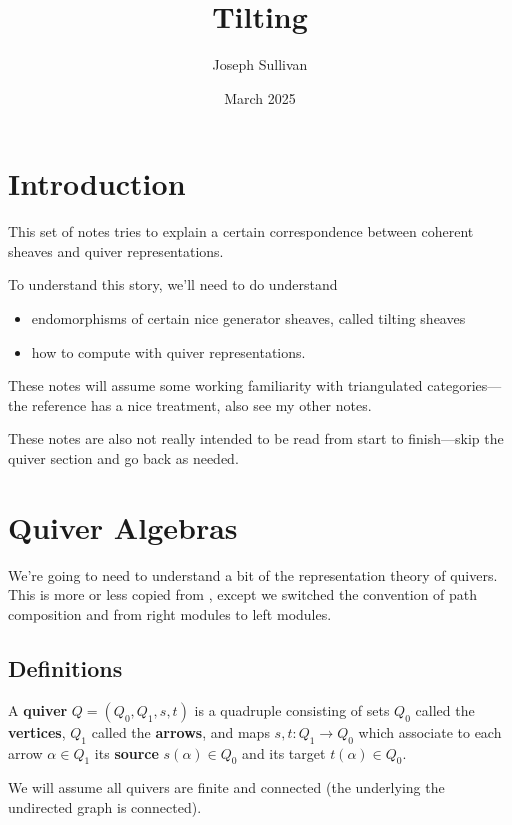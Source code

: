 \documentclass[12pt]{article}
\title{Tilting}
\author{Joseph Sullivan}
\date{March 2025}
\begin{document}
\maketitle
\tableofcontents

\section{Introduction}

This set of notes tries to explain a certain correspondence between coherent sheaves and quiver representations.

To understand this story, we'll need to do understand
\begin{itemize}
    \item endomorphisms of certain nice generator sheaves, called tilting sheaves
    \item how to compute with quiver representations.
\end{itemize}

These notes will assume some working familiarity with triangulated categories---the reference \cite{calThesis} has a nice treatment, also see my other notes.

These notes are also not really intended to be read from start to finish---skip the quiver section and go back as needed.

\section{Quiver Algebras}\label{quiver-section}

We're going to need to understand a bit of the representation theory of quivers. This is more or less copied from \cite{quiver}, except we switched the convention of path composition and from right modules to left modules.

\subsection{Definitions}

\begin{defn}
    A \textbf{quiver} $Q=(Q_0,Q_1,s,t)$ is a quadruple consisting of sets $Q_0$ called the \textbf{vertices}, $Q_1$ called the \textbf{arrows}, and maps $s,t:Q_1\to Q_0$ which associate to each arrow $\alpha\in Q_1$ its \textbf{source} $s(\alpha)\in Q_0$ and its target $t(\alpha)\in Q_0$.

    We will assume all quivers are finite and connected (the underlying the undirected graph is connected).
\end{defn}
\end{document}
